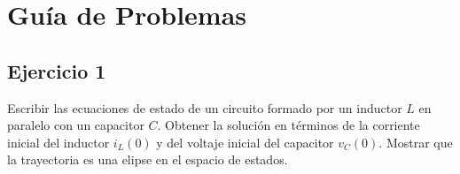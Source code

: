\documentclass[10pt,a4paper]{article} %
\begin{document}
	
	
	
%	
%	
%	
%	
%	
%	
\newpage
	\section{Guía de Problemas}
	\subsection{Ejercicio 1} Escribir las ecuaciones de estado de un circuito formado por un inductor $L$ en paralelo con un capacitor $C$. Obtener la solución en términos de la corriente inicial del inductor $i_L(0)$ y del voltaje inicial del capacitor $v_C(0)$. Mostrar que la trayectoria es una elipse en el espacio de estados.\\
	
\end{document}
